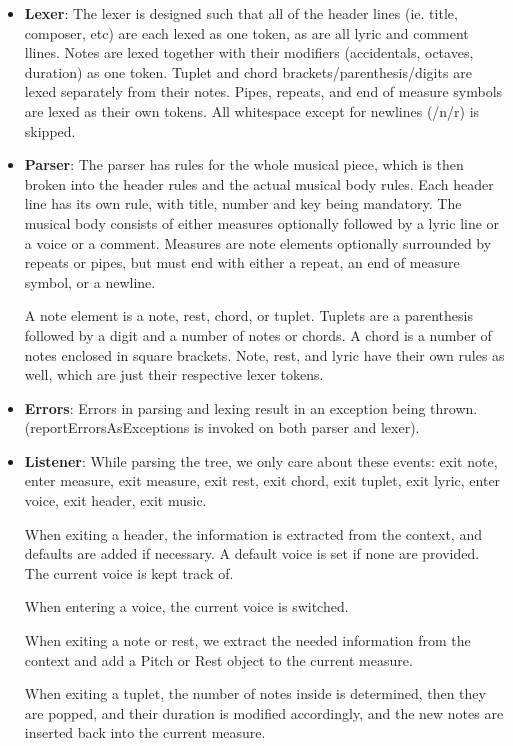 \documentclass[12pt]{book}
\begin{document}
\begin{itemize}
\item {\bf Lexer}: The lexer is designed such that all of the header lines (ie. title, composer, etc) are each lexed as one token, as are all lyric and comment llines. Notes are lexed together with their modifiers (accidentals, octaves, duration) as one token. Tuplet and chord brackets/parenthesis/digits are lexed separately from their notes. Pipes, repeats, and end of measure symbols are lexed as their own tokens. All whitespace except for newlines (/n/r) is skipped.

\item {\bf Parser}: The parser has rules for the whole musical piece, which is then broken into the header rules and the actual musical body rules. Each header line has its own rule, with title, number and key being mandatory. The musical body consists of either measures optionally followed by a lyric line or a voice or a comment. Measures are note elements optionally surrounded by repeats or pipes, but must end with either a repeat, an end of measure symbol, or a newline. 

A note element is a note, rest, chord, or tuplet. Tuplets are a parenthesis followed by a digit and a number of notes or chords. A chord is a number of notes enclosed in square brackets. Note, rest, and lyric have their own rules as well, which are just their respective lexer tokens.

\item {\bf Errors}: Errors in parsing and lexing result in an exception being thrown. (reportErrorsAsExceptions is invoked on both parser and lexer).

\item {\bf Listener}: While parsing the tree, we only care about these events: exit note, enter measure, exit measure, exit rest, exit chord, exit tuplet, exit lyric, enter voice, exit header, exit music.

When exiting a header, the information is extracted from the context, and defaults are added if necessary. A default voice is set if none are provided. The current voice is kept track of.

When entering a voice, the current voice is switched.

When exiting a note or rest, we extract the needed information from the context and add a Pitch or Rest object to the current measure. 

When exiting a tuplet, the number of notes inside is determined, then they are popped, and their duration is modified accordingly, and the new notes are inserted back into the current measure.


\end{itemize}
\end{document}
